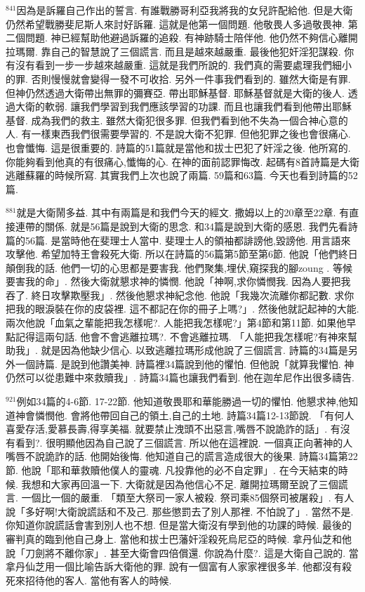 \documentclass{book}
\begin{document}
$^{841}$因為是訴羅自己作出的誓言.
有誰戰勝哥利亞我將我的女兒許配給他.
但是大衛仍然希望戰勝斐尼斯人來討好訴羅.
這就是他第一個問題.
他敬畏人多過敬畏神.
第二個問題.
神已經幫助他避過訴羅的追殺.
有神跡騎士陪伴他.
他仍然不夠信心離開拉瑪爾.
靠自己的智慧說了三個謊言.
而且是越來越嚴重.
最後他犯奸淫犯謀殺.
你有沒有看到一步一步越來越嚴重.
這就是我們所說的.
我們真的需要處理我們細小的罪.
否則慢慢就會變得一發不可收拾.
另外一件事我們看到的.
雖然大衛是有罪.
但神仍然透過大衛帶出無罪的彌賽亞.
帶出耶穌基督.
耶穌基督就是大衛的後人.
透過大衛的軟弱.
讓我們學習到我們應該學習的功課.
而且也讓我們看到他帶出耶穌基督.
成為我們的救主.
雖然大衛犯很多罪.
但我們看到他不失為一個合神心意的人.
有一樣東西我們很需要學習的.
不是說大衛不犯罪.
但他犯罪之後也會很痛心.
也會懺悔.
這是很重要的.
詩篇的51篇就是當他和拔士巴犯了奸淫之後.
他所寫的.
你能夠看到他真的有很痛心,懺悔的心.
在神的面前認罪悔改.
起碼有8首詩篇是大衛逃離蘇羅的時候所寫.
其實我們上次也說了兩篇.
59篇和63篇.
今天也看到詩篇的52篇.

$^{881}$就是大衛鬧多益.
其中有兩篇是和我們今天的經文.
撒姆以上的20章至22章.
有直接連帶的關係.
就是56篇是說到大衛的思念.
和34篇是說到大衛的感恩.
我們先看詩篇的56篇.
是當時他在斐理士人當中.
斐理士人的領袖都誹謗他,毀謗他.
用言語來攻擊他.
希望加特王會殺死大衛.
所以在詩篇的56篇第5節至第6節.
他說「他們終日顛倒我的話.
他們一切的心思都是要害我.
他們聚集,埋伏,窺探我的腳zoung .
等候要害我的命」.
然後大衛就懇求神的憐憫.
他說「神啊,求你憐憫我.
因為人要把我吞了.
終日攻擊欺壓我」.
然後他懇求神紀念他.
他說「我幾次流離你都記數.
求你把我的眼淚裝在你的皮袋裡.
這不都記在你的冊子上嗎?」.
然後他就記起神的大能.
兩次他說「血氣之輩能把我怎樣呢?.
人能把我怎樣呢?」第4節和第11節.
如果他早點記得這兩句話.
他會不會逃離拉瑪?.
不會逃離拉瑪.
「人能把我怎樣呢?有神來幫助我」.
就是因為他缺少信心.
以致逃離拉瑪形成他說了三個謊言.
詩篇的34篇是另外一個詩篇.
是說到他讚美神.
詩篇裡34篇說到他的懼怕.
但他說「就算我懼怕.
神仍然可以從患難中來救贖我」.
詩篇34篇也讓我們看到.
他在迦牟尼作出很多禱告.

$^{921}$例如34篇的4-6節.
17-22節.
他知道敬畏耶和華能勝過一切的懼怕.
他懇求神,他知道神會憐憫他.
會將他帶回自己的領土,自己的土地.
詩篇34篇12-13節說.
「有何人喜愛存活,愛慕長壽,得享美福.
就要禁止洩頭不出惡言,嘴唇不說詭詐的話」.
有沒有看到?.
很明顯他因為自己說了三個謊言.
所以他在這裡說.
一個真正向著神的人嘴唇不說詭詐的話.
他開始後悔.
他知道自己的謊言造成很大的後果.
詩篇34篇第22節.
他說「耶和華救贖他僕人的靈魂.
凡投靠他的必不自定罪」.
在今天結束的時候.
我想和大家再回溫一下.
大衛就是因為他信心不足.
離開拉瑪爾至說了三個謊言.
一個比一個的嚴重.
「類至大祭司一家人被殺.
祭司乘85個祭司被屠殺」.
有人說「多好啊!大衛說謊話和不及己.
那些懲罰去了別人那裡.
不怕說了」.
當然不是.
你知道你說謊話會害到別人也不想.
但是當大衛沒有學到他的功課的時候.
最後的審判真的臨到他自己身上.
當他和拔士巴藩奸淫殺死烏尼亞的時候.
拿丹仙芝和他說「刀劍將不離你家」.
甚至大衛會四倍償還.
你說為什麼?.
這是大衛自己說的.
當拿丹仙芝用一個比喻告訴大衛他的罪.
說有一個富有人家家裡很多羊.
他都沒有殺死來招待他的客人.
當他有客人的時候.
\end{document}
